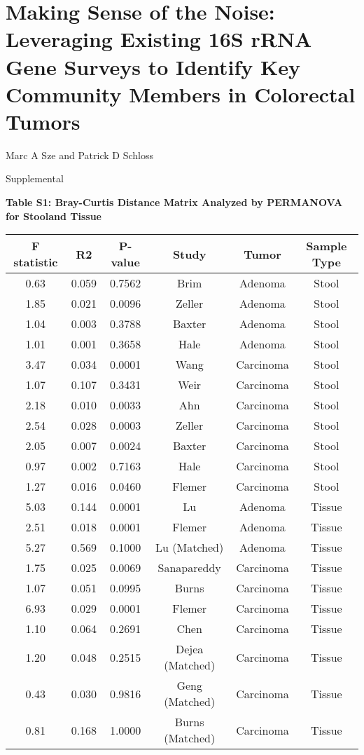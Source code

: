 \documentclass[12pt,]{article}
\title{}
\author{}
\date{}
\begin{document}
\section{Making Sense of the Noise: Leveraging Existing 16S rRNA Gene
Surveys to Identify Key Community Members in Colorectal
Tumors}\label{making-sense-of-the-noise-leveraging-existing-16s-rrna-gene-surveys-to-identify-key-community-members-in-colorectal-tumors}

\vspace{10mm}

\begin{center}
Marc A Sze and Patrick D Schloss

\vspace{10mm}

Supplemental
\end{center}

\newpage

\textbf{Table S1: Bray-Curtis Distance Matrix Analyzed by PERMANOVA for
Stooland Tissue}

\begin{longtable}[]{@{}cccccc@{}}
\toprule
F statistic & R2 & P-value & Study & Tumor & Sample Type\tabularnewline
\midrule
\endhead
0.63 & 0.059 & 0.7562 & Brim & Adenoma & Stool\tabularnewline
1.85 & 0.021 & 0.0096 & Zeller & Adenoma & Stool\tabularnewline
1.04 & 0.003 & 0.3788 & Baxter & Adenoma & Stool\tabularnewline
1.01 & 0.001 & 0.3658 & Hale & Adenoma & Stool\tabularnewline
3.47 & 0.034 & 0.0001 & Wang & Carcinoma & Stool\tabularnewline
1.07 & 0.107 & 0.3431 & Weir & Carcinoma & Stool\tabularnewline
2.18 & 0.010 & 0.0033 & Ahn & Carcinoma & Stool\tabularnewline
2.54 & 0.028 & 0.0003 & Zeller & Carcinoma & Stool\tabularnewline
2.05 & 0.007 & 0.0024 & Baxter & Carcinoma & Stool\tabularnewline
0.97 & 0.002 & 0.7163 & Hale & Carcinoma & Stool\tabularnewline
1.27 & 0.016 & 0.0460 & Flemer & Carcinoma & Stool\tabularnewline
5.03 & 0.144 & 0.0001 & Lu & Adenoma & Tissue\tabularnewline
2.51 & 0.018 & 0.0001 & Flemer & Adenoma & Tissue\tabularnewline
5.27 & 0.569 & 0.1000 & Lu (Matched) & Adenoma & Tissue\tabularnewline
1.75 & 0.025 & 0.0069 & Sanapareddy & Carcinoma & Tissue\tabularnewline
1.07 & 0.051 & 0.0995 & Burns & Carcinoma & Tissue\tabularnewline
6.93 & 0.029 & 0.0001 & Flemer & Carcinoma & Tissue\tabularnewline
1.10 & 0.064 & 0.2691 & Chen & Carcinoma & Tissue\tabularnewline
1.20 & 0.048 & 0.2515 & Dejea (Matched) & Carcinoma &
Tissue\tabularnewline
0.43 & 0.030 & 0.9816 & Geng (Matched) & Carcinoma &
Tissue\tabularnewline
0.81 & 0.168 & 1.0000 & Burns (Matched) & Carcinoma &
Tissue\tabularnewline
\bottomrule
\end{longtable}
\end{document}

